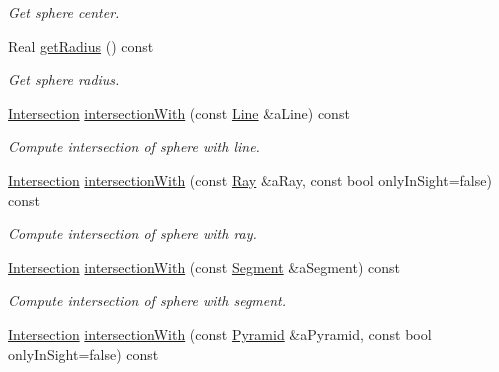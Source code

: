 \begin{DoxyCompactItemize}
\begin{DoxyCompactList}\small\item\em Get sphere center. \end{DoxyCompactList}\item 
Real \hyperlink{classlibrary_1_1math_1_1geom_1_1d3_1_1objects_1_1_sphere_a48cfc72b6eec9a953fb837a13e1df45e}{get\+Radius} () const
\begin{DoxyCompactList}\small\item\em Get sphere radius. \end{DoxyCompactList}\item 
\hyperlink{classlibrary_1_1math_1_1geom_1_1d3_1_1_intersection}{Intersection} \hyperlink{classlibrary_1_1math_1_1geom_1_1d3_1_1objects_1_1_sphere_a6cee64ab56c136802a08d7b5403b80ac}{intersection\+With} (const \hyperlink{classlibrary_1_1math_1_1geom_1_1d3_1_1objects_1_1_line}{Line} \&a\+Line) const
\begin{DoxyCompactList}\small\item\em Compute intersection of sphere with line. \end{DoxyCompactList}\item 
\hyperlink{classlibrary_1_1math_1_1geom_1_1d3_1_1_intersection}{Intersection} \hyperlink{classlibrary_1_1math_1_1geom_1_1d3_1_1objects_1_1_sphere_a2d142839c409faebccc36999d464e3bd}{intersection\+With} (const \hyperlink{classlibrary_1_1math_1_1geom_1_1d3_1_1objects_1_1_ray}{Ray} \&a\+Ray, const bool only\+In\+Sight=false) const
\begin{DoxyCompactList}\small\item\em Compute intersection of sphere with ray. \end{DoxyCompactList}\item 
\hyperlink{classlibrary_1_1math_1_1geom_1_1d3_1_1_intersection}{Intersection} \hyperlink{classlibrary_1_1math_1_1geom_1_1d3_1_1objects_1_1_sphere_a49323ca9a05b902b57011631eb0b5b57}{intersection\+With} (const \hyperlink{classlibrary_1_1math_1_1geom_1_1d3_1_1objects_1_1_segment}{Segment} \&a\+Segment) const
\begin{DoxyCompactList}\small\item\em Compute intersection of sphere with segment. \end{DoxyCompactList}\item 
\hyperlink{classlibrary_1_1math_1_1geom_1_1d3_1_1_intersection}{Intersection} \hyperlink{classlibrary_1_1math_1_1geom_1_1d3_1_1objects_1_1_sphere_ac7a5e8323eca47f121a457b99fbf6627}{intersection\+With} (const \hyperlink{classlibrary_1_1math_1_1geom_1_1d3_1_1objects_1_1_pyramid}{Pyramid} \&a\+Pyramid, const bool only\+In\+Sight=false) const

\end{DoxyCompactItemize}
